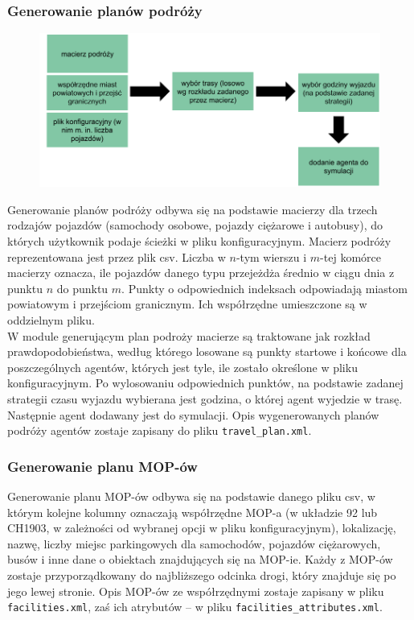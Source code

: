 \subsubsection{Generowanie planów podróży}
    \begin{figure}[h]
        \includegraphics[width=\textwidth]{images/mopsim/mopsim-travelplan.png}
    \end{figure}
Generowanie planów podróży odbywa się na podstawie macierzy dla trzech rodzajów pojazdów (samochody osobowe, pojazdy ciężarowe i autobusy), do których użytkownik podaje ścieżki w pliku konfiguracyjnym. Macierz podróży reprezentowana jest przez plik csv. Liczba w $n$-tym wierszu i $m$-tej komórce macierzy oznacza, ile pojazdów danego typu przejeżdża średnio w ciągu dnia z punktu $n$ do punktu $m$. Punkty o odpowiednich indeksach odpowiadają miastom powiatowym i przejściom granicznym. Ich współrzędne umieszczone są w oddzielnym pliku.\\
W module generującym plan podroży macierze są traktowane jak rozkład prawdopodobieństwa, według którego losowane są punkty startowe i końcowe dla poszczególnych agentów, których jest tyle, ile zostało określone w pliku konfiguracyjnym. Po wylosowaniu odpowiednich punktów, na podstawie zadanej strategii czasu wyjazdu wybierana jest godzina, o której agent wyjedzie w trasę. Następnie agent dodawany jest do symulacji. Opis wygenerowanych planów podróży agentów zostaje zapisany do pliku \texttt{travel\_plan.xml}.

\subsubsection{Generowanie planu MOP-ów}
Generowanie planu MOP-ów odbywa się na podstawie danego pliku csv, w którym kolejne kolumny oznaczają współrzędne MOP-a (w układzie 92 lub CH1903, w zależności od wybranej opcji w pliku konfiguracyjnym), lokalizację, nazwę, liczby miejsc parkingowych dla samochodów, pojazdów ciężarowych, busów i inne dane o obiektach znajdujących się na MOP-ie. Każdy z MOP-ów zostaje przyporządkowany do najbliższego odcinka drogi, który znajduje się po jego lewej stronie. Opis MOP-ów ze współrzędnymi zostaje zapisany w pliku \texttt{facilities.xml}, zaś ich atrybutów -- w pliku \texttt{facilities\_attributes.xml}.
